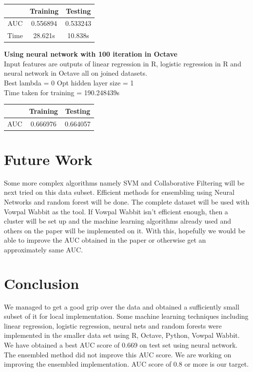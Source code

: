 \documentclass[10pt]{article}
\begin{document}
\begin{center}
 \begin{tabular}{|c | c | c||} 
 \hline
 & Training & Testing\\ [0.5ex] 
 \hline\hline
AUC & 0.556894 & 0.533243\\ 
 \hline
Time & 28.621s & 10.838s\\ 
 \hline
\end{tabular}
\end{center}
\textbf{Using neural network with 100 iteration in Octave}\\
Input features are outputs of linear regression in R, logistic regression in R and neural network in Octave all on joined datasets.\\
	Best lambda = 0 Opt hidden layer size = 1 \\
	Time taken for training = 190.248439s
\begin{center}
 \begin{tabular}{|c | c | c ||} 
 \hline
 & Training & Testing\\ [0.5ex] 
 \hline\hline
AUC & 0.666976 & 0.664057\\
 \hline
\end{tabular}
\end{center}

\section{Future Work}
Some more complex algorithms namely SVM and Collaborative Filtering will be next tried on this data subset. Efficient methods for ensembling using Neural Networks and random forest will be done. The complete dataset will be used with Vowpal Wabbit as the tool. If Vowpal Wabbit isn't efficient enough, then a cluster will be set up and the machine learning algorithms already used and others on the paper will be implemented on it. With this, hopefully we would be able to improve the AUC obtained in the paper or otherwise get an approximately same AUC.

\section{Conclusion}
We managed to get a good grip over the data and obtained a sufficiently small subset of it for local implementation. Some machine learning techniques including linear regression, logistic regression, neural nets and random forests were implemented in the smaller data set using R, Octave, Python, Vowpal Wabbit. We have obtained a best AUC score of 0.669 on test set using neural network. The ensembled method did not improve this AUC score. We are working on improving the ensembled implementation. AUC score of 0.8 or more is our target.
\end{document}
